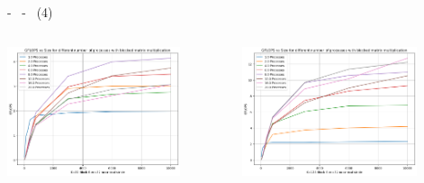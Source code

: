 \documentclass[compress]{beamer}
\begin{document}
\begin{frame}{\secname \text{ }- \subsecname\ \text{ }- \subsubsecname\ (4)}
    \begin{columns}
            \begin{minipage}{1\textwidth}
                \centering
                \begin{adjustbox}{margin=0cm 0cm 0cm 0cm, center} %
                    \includegraphics[width=0.8\textwidth, frame]{resources/rect_k32_blocked_nocrit.png}
                \end{adjustbox}
                \begin{adjustbox}{margin=0cm 0cm 0cm 0.1cm, center} %
                    \includegraphics[width=0.8\textwidth, frame]{resources/rect_k128_blocked_nocrit.png}
                \end{adjustbox}
            \end{minipage}
            \begin{minipage}{1\textwidth}

\end{minipage}
\end{columns}
\end{frame}
\end{document}
